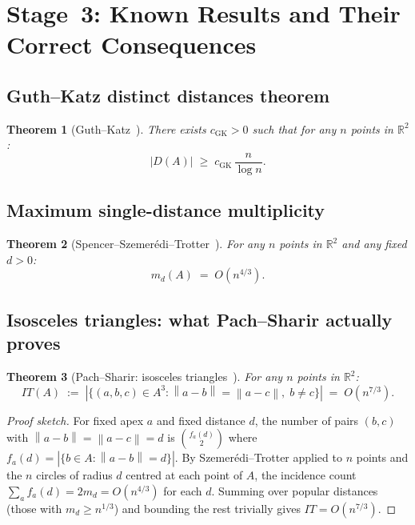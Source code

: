 \documentclass[12pt,a4paper]{amsart}
\theoremstyle{plain}
\newtheorem{theorem}{Theorem}[section]
\theoremstyle{definition}
\newcommand{\R}{\mathbb{R}}
\newcommand{\abs}[1]{\left\lvert #1 \right\rvert}
\newcommand{\norm}[1]{\left\lVert #1 \right\rVert}
\begin{document}
\section{Stage~3: Known Results and Their Correct Consequences}
\label{sec:external}

\subsection{Guth--Katz distinct distances theorem}

\begin{theorem}[Guth--Katz~\cite{GK15}]
\label{thm:GK}
There exists $c_{\mathrm{GK}} > 0$ such that for any $n$ points
in $\R^2$:
\[
  \abs{D(A)} \;\ge\; c_{\mathrm{GK}}\,\frac{n}{\log n}.
\]
\end{theorem}

\subsection{Maximum single-distance multiplicity}

\begin{theorem}[Spencer--Szemer\'edi--Trotter~\cite{SST84}]
\label{thm:SST}
For any $n$ points in $\R^2$ and any fixed $d > 0$:
\[
  m_d(A) \;=\; O(n^{4/3}).
\]
\end{theorem}

\subsection{Isosceles triangles: what Pach--Sharir actually proves}

\begin{theorem}[Pach--Sharir: isosceles triangles~\cite{PS98}]
\label{thm:PS_IT}
For any $n$ points in $\R^2$:
\[
  IT(A) \;:=\;
  \abs{\{(a,b,c) \in A^3 : \norm{a-b} = \norm{a-c},\; b \ne c\}}
  \;=\; O(n^{7/3}).
\]
\end{theorem}

\begin{proof}[Proof sketch]
For fixed apex $a$ and fixed distance $d$, the number of pairs
$(b,c)$ with $\norm{a-b}=\norm{a-c}=d$ is $\binom{f_a(d)}{2}$ where
$f_a(d) = \abs{\{b \in A : \norm{a-b} = d\}}$.
By Szemer\'edi--Trotter applied to $n$ points and the $n$ circles of
radius $d$ centred at each point of $A$, the incidence count
$\sum_a f_a(d) = 2m_d = O(n^{4/3})$ for each $d$.
Summing over popular distances (those with $m_d \ge n^{1/3}$) and
bounding the rest trivially gives $IT = O(n^{7/3})$.
\end{proof}
\end{document}
